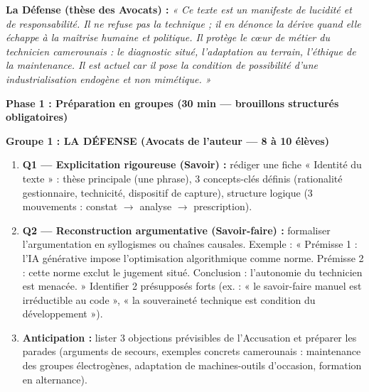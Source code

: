 \documentclass[11pt]{article}
\newcommand{\cle}[1]{{\popxbold\color{popdark}#1}}
\newcounter{popsec}
\newcounter{popsub}
\newcommand{\courssub}[1]{%
  \stepcounter{popsub}%
  \par\vspace{9pt}\noindent{\popxbold\fontsize{11.5}{13}\selectfont\color{popink}{\color{poporange}\thepopsec.\thepopsub}\hspace{6pt}#1}\par\nopagebreak\vspace{4pt}
}
\begin{document}
\textbf{La Défense (thèse des Avocats) :} \emph{« Ce texte est un manifeste de lucidité et de responsabilité. Il ne refuse pas la technique ; il en dénonce la dérive quand elle échappe à la maîtrise humaine et politique. Il protège le c\oe ur de métier du technicien camerounais : le diagnostic situé, l'adaptation au terrain, l'éthique de la maintenance. Il est actuel car il pose la condition de possibilité d'une industrialisation endogène et non mimétique. »}

\courssub{Consignes}
\textbf{Phase 1 : Préparation en groupes (30 min --- brouillons structurés obligatoires)}

\textbf{Groupe 1 : LA DÉFENSE (Avocats de l'auteur --- 8 à 10 élèves)}
\begin{enumerate}
    \item \textbf{Q1 --- Explicitation rigoureuse (Savoir) :} rédiger une fiche « Identité du texte » : thèse principale (une phrase), 3 concepts-clés définis (\cle{rationalité gestionnaire}, \cle{technicité}, \cle{dispositif de capture}), structure logique (3 mouvements : constat $\rightarrow$ analyse $\rightarrow$ prescription).
    \item \textbf{Q2 --- Reconstruction argumentative (Savoir-faire) :} formaliser l'argumentation en \cle{syllogismes} ou \cle{chaînes causales}. Exemple : « Prémisse 1 : l'IA générative impose l'optimisation algorithmique comme norme. Prémisse 2 : cette norme exclut le jugement situé. Conclusion : l'autonomie du technicien est menacée. » Identifier 2 \cle{présupposés} forts (ex. : « le savoir-faire manuel est irréductible au code », « la souveraineté technique est condition du développement »).
    \item \textbf{Anticipation :} lister 3 objections prévisibles de l'Accusation et préparer les \cle{parades} (arguments de secours, exemples concrets camerounais : maintenance des groupes électrogènes, adaptation de machines-outils d'occasion, formation en alternance).
\end{enumerate}
\end{document}

